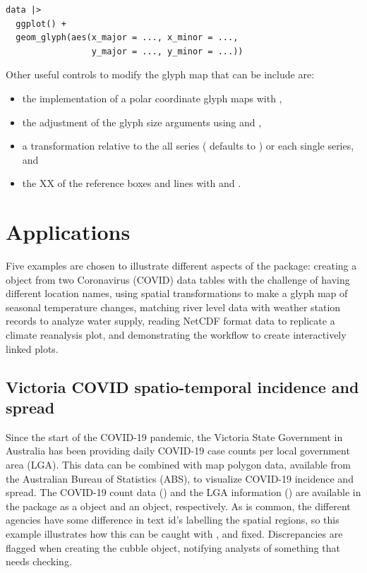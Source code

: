 \documentclass[
  shortnames]{jss}
\providecommand{\tightlist}{%
  \setlength{\itemsep}{0pt}\setlength{\parskip}{0pt}}
\begin{document}
\begin{verbatim}
data |> 
  ggplot() +
  geom_glyph(aes(x_major = ..., x_minor = ..., 
                 y_major = ..., y_minor = ...))
\end{verbatim}

Other useful controls to modify the glyph map that can be include are:

\begin{itemize}
\tightlist
\item
  the implementation of a polar coordinate glyph maps with ,
\item
  the adjustment of the glyph size arguments using  and ,
\item
  a transformation relative to the all series ( defaults to ) or each single series, and
\item
  the XX of the reference boxes and lines with  and .
\end{itemize}

\hypertarget{examples}{%
\section{Applications}\label{examples}}

Five examples are chosen to illustrate different aspects of the  package: creating a  object from two Coronavirus (COVID) data tables with the challenge of having different location names, using spatial transformations to make a glyph map of seasonal temperature changes, matching river level data with weather station records to analyze water supply, reading NetCDF format data to replicate a climate reanalysis plot, and demonstrating the workflow to create interactively linked plots.

\hypertarget{covid}{%
\subsection{Victoria COVID spatio-temporal incidence and spread}\label{covid}}

Since the start of the COVID-19 pandemic, the Victoria State Government in Australia has been providing daily COVID-19 case counts per local government area (LGA). This data can be combined with map polygon data, available from the Australian Bureau of Statistics (ABS), to visualize COVID-19 incidence and spread. The COVID-19 count data () and the LGA information () are available in the  package as a  object and an  object, respectively. As is common, the different agencies have some difference in text id's labelling the spatial regions, so this example illustrates how this can be caught with , and fixed. Discrepancies are flagged when creating the cubble object, notifying analysts of something that needs checking.
\end{document}
